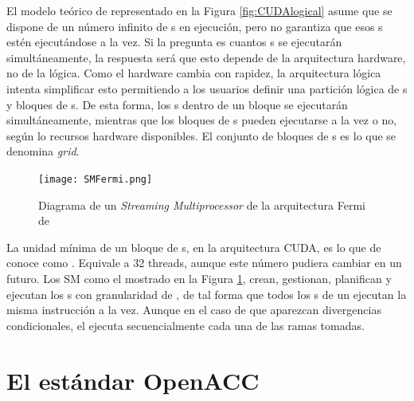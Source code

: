 El modelo teórico de \CUDA{} representado en la Figura \ref{fig:CUDAlogical} asume que se 
dispone de un número infinito de \thread{}s en 
ejecución, pero no garantiza que esos \thread{}s estén ejecutándose a la vez. Si la 
pregunta es cuantos \thread{}s se ejecutarán simultáneamente, la respuesta será que 
esto depende de la arquitectura hardware, no de la lógica. Como el hardware cambia con 
rapidez, la arquitectura lógica intenta simplificar esto
permitiendo a los usuarios definir una partición lógica de \thread{}s y bloques de 
\thread{}s. De esta forma, los \thread{}s dentro de un bloque se ejecutarán 
simultáneamente, mientras que los bloques de \thread{}s pueden ejecutarse a la vez o no,
según lo recursos hardware disponibles. El conjunto de bloques de \thread{}s es lo que se 
denomina \textit{grid}.

\begin{figure}[!h]
	\centering
	\texttt{[image: SMFermi.png]}
	\caption{Diagrama de un \textit{Streaming Multiprocessor} de la arquitectura Fermi de \NVIDIA{}}
	\label{fig:SMFermi}
\end{figure}

La unidad mínima de un bloque de \thread{}s, en la arquitectura CUDA, es lo que de conoce 
como \warp{}. Equivale a 32 threads, aunque este número pudiera cambiar en un futuro. Los 
\ac{SM} como el mostrado en la Figura \ref{fig:SMFermi}, crean, gestionan, planifican
y ejecutan los \thread{}s con granularidad de \warp{}, de tal forma que todos los 
\thread{}s de un \warp{} ejecutan la misma instrucción a la vez. Aunque en el caso de que 
aparezcan divergencias condicionales, el \warp{} ejecuta secuencialmente cada una de las 
ramas tomadas.


\section{El estándar \ac{OpenACC}}


